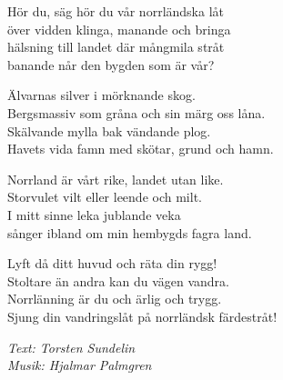 \vspace{10pt}
Hör du, säg hör du vår norrländska låt\\
över vidden klinga, manande och bringa\\
hälsning till landet där mångmila stråt\\
banande når den bygden som är vår?\par
\vspace{10pt}
Älvarnas silver i mörknande skog.\\
Bergsmassiv som gråna och sin märg oss låna.\\
Skälvande mylla bak vändande plog.\\
Havets vida famn med skötar, grund och hamn.\par
\vspace{10pt}
Norrland är vårt rike, landet utan like.\\
Storvulet vilt eller leende och milt.\\
I mitt sinne leka jublande veka\\
sånger ibland om min hembygds fagra land.\par
\vspace{10pt}
Lyft då ditt huvud och räta din rygg!\\
Stoltare än andra kan du vägen vandra.\\
Norrlänning är du och ärlig och trygg.\\
Sjung din vandringslåt på norrländsk färdestråt!\par
\vspace{10pt}
{\footnotesize\textit{Text: Torsten Sundelin\\
Musik: Hjalmar Palmgren}}
